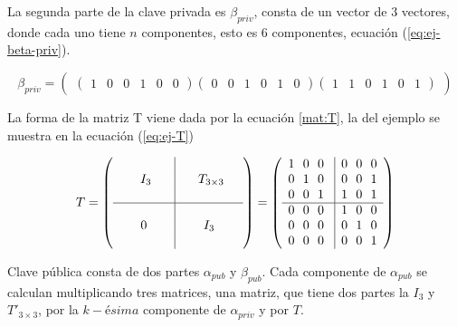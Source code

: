 La segunda parte de la clave privada es $\beta_{priv}$, consta de un vector de $3$ vectores, donde cada uno tiene $n$ componentes, esto es $6$ componentes, ecuación (\ref{eq:ej-beta-priv}).

\begin{equation}\label{eq:ej-beta-priv}
{\beta_{priv}} = 
	\left(\begin{matrix}
		\left(\begin{smallmatrix}
			1 & 0 & 0 & 1 & 0 & 0
		\end{smallmatrix}\right)
	
		\left(\begin{smallmatrix}
			0 & 0 & 1 & 0 & 1 & 0
		\end{smallmatrix}\right)
	
		\left(\begin{smallmatrix}
			1 & 1 & 0 & 1 & 0 & 1
		\end{smallmatrix}\right)
	\end{matrix}\right)
\end{equation}


La forma de la matriz T viene dada por la ecuación \ref{mat:T}, la del ejemplo se muestra en la ecuación (\ref{eq:ej-T})

\begin{equation}\label{eq:ej-T}
{T} =
	\left(\begin{array}{c|c}
	\\
	\ \ \ \ \ I_3\ \ \ \ & \ \ \ \ T_{3\times 3} \ \ \  \\
	\\
	\hline
	\\
	0 & I_3\\
	\\
	\end{array}\right) =
	\left(\begin{array}{c|c}
		1\ \ 0\ \ 0\ & 0\ \ 0\ \ 0\\
		0\ \ 1\ \ 0\ & 0\ \ 0\ \ 1\\
		0\ \ 0\ \ 1\ & 1\ \ 0\ \ 1\\
		\hline
		0\ \ 0\ \ 0\ & 1\ \ 0\ \ 0\\
		0\ \ 0\ \ 0\ & 0\ \ 1\ \ 0\\
		0\ \ 0\ \ 0\ & 0\ \ 0\ \ 1
	\end{array}\right)
\end{equation}


Clave pública consta de dos partes $\alpha_{pub}$ y $\beta_{pub}$. Cada  componente de $\alpha_{pub}$ se calculan multiplicando tres matrices, una matriz, que tiene dos partes la $I_3$ y $T'_{3\times 3}$, por la $k-ésima$ componente de $\alpha_{priv}$ y por $T$.

